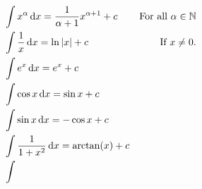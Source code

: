 \begin{theorem}
    \begin{align}
        & \int x^\alpha \mathop{}\!\mathrm{d} x = \frac{1}{\alpha + 1}x^{\alpha + 1} + c & \text{For all \(\alpha \in \mathbb{N}\)}\\
        & \int \frac{1}{x} \mathop{}\!\mathrm{d} x = \ln |x| + c & \text{If \(x \neq 0\).} \\
        & \int e^x \mathop{}\!\mathrm{d} x = e^x + c & \\
        & \int \cos x \mathop{}\!\mathrm{d} x = \sin x + c& \\
        & \int \sin x \mathop{}\!\mathrm{d} x = -\cos x + c& \\
        & \int \frac{1}{1 + x^2} \mathop{}\!\mathrm{d} x = \arctan(x) + c & \\
        & \int 
    \end{align}
\end{theorem}